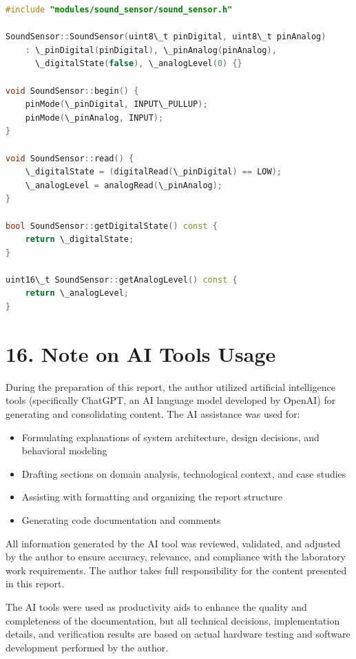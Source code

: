 \documentclass[12pt]{article}
\begin{document}
\begin{lstlisting}[language=C++, caption=sound_sensor.cpp - Sound Sensor Driver Implementation]
#include "modules/sound_sensor/sound_sensor.h"

SoundSensor::SoundSensor(uint8\_t pinDigital, uint8\_t pinAnalog)
    : \_pinDigital(pinDigital), \_pinAnalog(pinAnalog),
      \_digitalState(false), \_analogLevel(0) {}

void SoundSensor::begin() {
    pinMode(\_pinDigital, INPUT\_PULLUP);
    pinMode(\_pinAnalog, INPUT);
}

void SoundSensor::read() {
    \_digitalState = (digitalRead(\_pinDigital) == LOW);
    \_analogLevel = analogRead(\_pinAnalog);
}

bool SoundSensor::getDigitalState() const {
    return \_digitalState;
}

uint16\_t SoundSensor::getAnalogLevel() const {
    return \_analogLevel;
}
\end{lstlisting}

\section*{16. Note on AI Tools Usage}

During the preparation of this report, the author utilized artificial intelligence tools (specifically ChatGPT, an AI language model developed by OpenAI) for generating and consolidating content. The AI assistance was used for:

\begin{itemize}
    \item Formulating explanations of system architecture, design decisions, and behavioral modeling
    \item Drafting sections on domain analysis, technological context, and case studies
    \item Assisting with formatting and organizing the report structure
    \item Generating code documentation and comments
\end{itemize}

All information generated by the AI tool was reviewed, validated, and adjusted by the author to ensure accuracy, relevance, and compliance with the laboratory work requirements. The author takes full responsibility for the content presented in this report.

The AI tools were used as productivity aids to enhance the quality and completeness of the documentation, but all technical decisions, implementation details, and verification results are based on actual hardware testing and software development performed by the author.
\end{document}
